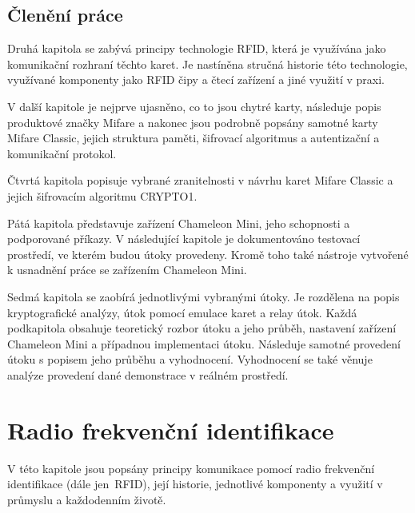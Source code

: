 \section*{Členění práce}
Druhá kapitola se zabývá principy technologie RFID, která je využívána jako komunikační rozhraní těchto karet. Je nastíněna stručná historie této technologie, využívané komponenty jako RFID čipy a čtecí zařízení a jiné využití v praxi.\par
V další kapitole je nejprve ujasněno, co to jsou chytré karty, následuje popis produktové značky Mifare a nakonec jsou podrobně popsány samotné karty Mifare Classic, jejich struktura paměti, šifrovací algoritmus a autentizační a komunikační protokol.\par
Čtvrtá kapitola popisuje vybrané zranitelnosti v návrhu karet Mifare Classic a jejich šifrovacím algoritmu CRYPTO1.\par
Pátá kapitola představuje zařízení Chameleon Mini, jeho schopnosti a podporované příkazy. 
V následující kapitole je dokumentováno testovací prostředí, ve kterém budou útoky provedeny. Kromě toho také nástroje vytvořené k usnadnění práce se zařízením Chameleon Mini.\par
Sedmá kapitola se zaobírá jednotlivými vybranými útoky. Je rozdělena na popis kryptografické analýzy, útok pomocí emulace karet a relay útok. Každá podkapitola obsahuje teoretický rozbor útoku a jeho průběh, nastavení zařízení Chameleon Mini a případnou implementaci útoku. Následuje samotné provedení útoku s popisem jeho průběhu a vyhodnocení. Vyhodnocení se také věnuje analýze provedení dané demonstrace v reálném prostředí.

\chapter{Radio frekvenční identifikace}
\label{technologie_rfid}
V této kapitole jsou popsány principy komunikace pomocí radio frekvenční identifikace (dále jen~RFID), její historie, jednotlivé komponenty a využití v průmyslu a každodenním životě.

